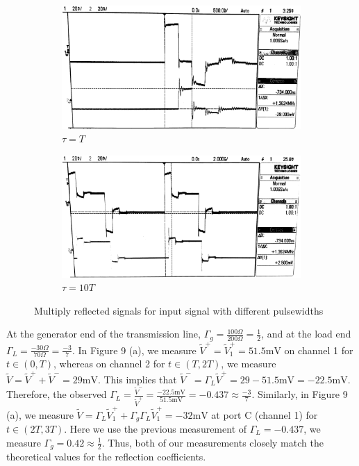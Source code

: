 \documentclass[10pt]{article}
\begin{document}
\begin{figure}[ht]
    \centering
    \begin{subfigure}[b]{0.45\textwidth}
        \includegraphics[width=\textwidth]{../photos/lab1/v_t_gamma_mult_1T.jpg}
        \caption{$\tau = T$}
    \end{subfigure}
    \quad
    \begin{subfigure}[b]{0.45\textwidth}
        \includegraphics[width=\textwidth]{../photos/lab1/v_t_gamma_mult_10T.jpg}
        \caption{$\tau = 10T$}
    \end{subfigure}
    \caption{Multiply reflected signals for input signal with different pulsewidths\vspace{-0.4cm}}
    \label{v_t_ref_mult}
\end{figure}

At the generator end of the transmission line, $\Gamma_g = \frac{100 \Omega}{200 \Omega} = \frac{1}{2}$, and
at the load end $\Gamma_L = \frac{-30 \Omega}{70 \Omega} = \frac{-3}{7}$. In Figure 9 (a), we measure
$\tilde V^+ = \tilde V_1^+ = 51.5\text{mV}$ on channel 1 for $t \in (0, T)$, whereas on channel 2 for $t \in (T, 2T)$, we measure $\tilde V = \tilde V^+ + \tilde V^- = 29\text{mV}$.
This implies that $\tilde V^- = \Gamma_L\tilde V^+ = 29 - 51.5\text{mV} = -22.5\text{mV}$. Therefore, the observed 
$\Gamma_L = \frac{\tilde V^-}{\tilde V^+} = \frac{-22.5\text{mV}}{51.5\text{mV}} = -0.437 \approx \frac{-3}{7}$. Similarly, in Figure 9 (a), 
we measure $\tilde V = \Gamma_L\tilde V_1^+ + \Gamma_g\Gamma_L\tilde V^+_1 = -32\text{mV}$ at port C (channel 1) for $t \in (2T, 3T)$.
Here we use the previous measurement of $\Gamma_L = -0.437$, we measure $\Gamma_g = 0.42 \approx \frac{1}{2}$. Thus, both of our 
measurements closely match the theoretical values for the reflection coefficients.
\end{document}

